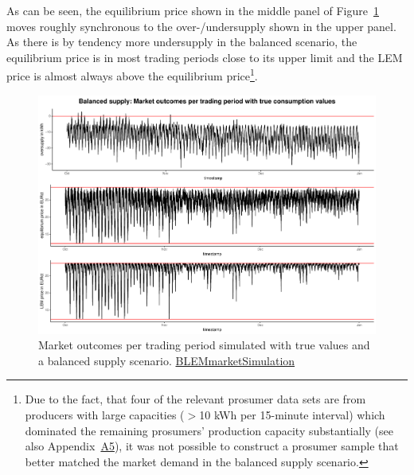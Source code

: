 As can be seen, the equilibrium price shown in the middle panel of Figure~\ref{Fig:marketoutcomes_true_balanced} moves roughly synchronous to the over-/undersupply shown in the upper panel. As there is by tendency more undersupply in the balanced scenario, the equilibrium price is in most trading periods close to its upper limit and the LEM price is almost always above the equilibrium price\footnote{Due to the fact, that four of the relevant prosumer data sets are from producers with large capacities ($>$10 kWh per 15-minute interval) which dominated the remaining prosumers' production capacity substantially (see also Appendix~\hyperlink{AppA5:Figures:producer_all}{A5}), it was not possible to construct a prosumer sample that better matched the market demand in the balanced supply scenario.}.
%
\begin{figure}[htbp]
    \centering
    \includegraphics[width=\textwidth]{thesis/graphs/marketsimulation/marketoutcome_true_balanced.pdf}
    \caption[Market outcomes simulated with balanced supply and true values]{Market outcomes per trading period simulated with true values and a balanced supply scenario. \quantnet\href{https://github.com/QuantLet/BLEM/tree/master/BLEMmarketSimulation}{BLEMmarketSimulation}}
    \label{Fig:marketoutcomes_true_balanced}
\end{figure}
%


